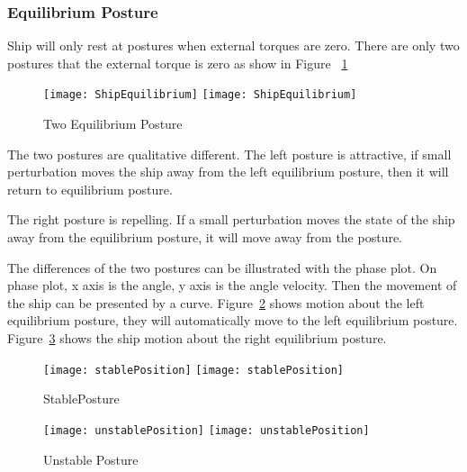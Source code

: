 \subsubsection*{Equilibrium Posture}
Ship will only rest at postures when external torques are zero.
There are only two postures that the external torque is zero as show in Figure ~\ref{fig:ShipEqulibrium}
\begin{figure}[!htbp]
  \begin{center}
    \leavevmode
    \ifpdf
      \texttt{[image: ShipEquilibrium]}
    \else
      \texttt{[image: ShipEquilibrium]}
    \fi
    \caption{Two Equilibrium Posture}
    \label{fig:ShipEqulibrium}
  \end{center}
\end{figure}



The two postures are qualitative different.
The left posture is attractive, if small perturbation moves the ship away from the left equilibrium posture, then it will return to equilibrium posture.

The right posture is repelling.
If a small perturbation moves the state of the ship away from the equilibrium posture, it will move away from the posture.

The differences of the two postures can be illustrated with the phase plot.
On phase plot, x axis is the angle, y axis is the angle velocity. 
Then the movement of the ship can be presented by a curve.
Figure~\ref{fig:StablePosture}  shows motion about the left equilibrium posture, they will automatically move to the left equilibrium posture.
Figure~\ref{fig:unStablePosture} shows the ship motion about the right equilibrium posture.
 
\begin{figure}[!htbp]
  \begin{center}
    \leavevmode
    \ifpdf
      \texttt{[image: stablePosition]}
    \else
      \texttt{[image: stablePosition]}
    \fi
    \caption{StablePosture}
    \label{fig:StablePosture}
  \end{center}
\end{figure}


\begin{figure}[!htbp]
  \begin{center}
    \leavevmode
    \ifpdf
      \texttt{[image: unstablePosition]}
    \else
      \texttt{[image: unstablePosition]}
    \fi
    \caption{Unstable Posture}
    \label{fig:unStablePosture}
  \end{center}
\end{figure}


